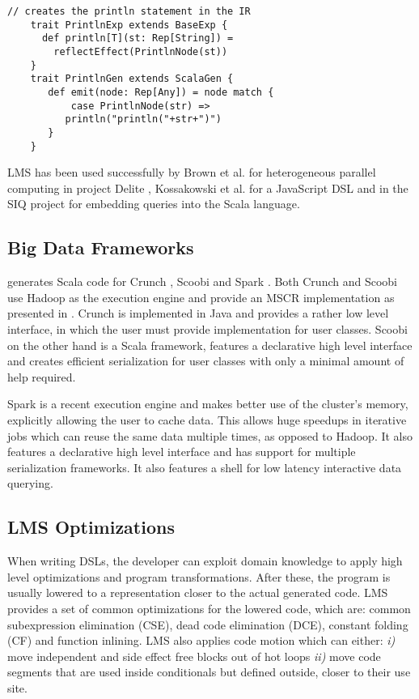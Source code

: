 \begin{lstlisting}[name=code, caption=Example of how the DSL module is specified. This module is used for measuring a performance of a block of code and can be reused in any other Scala backed DSL. ,captionpos=b, label=lst:println_dsl, float=t]
    // creates the println statement in the IR
    trait PrintlnExp extends BaseExp {
      def println[T](st: Rep[String]) =
        reflectEffect(PrintlnNode(st)) 
    }
    trait PrintlnGen extends ScalaGen {
       def emit(node: Rep[Any]) = node match {
           case PrintlnNode(str) =>
	      println("println("+str+")")
       }
    }
\end{lstlisting}

LMS has been used successfully by Brown et al. for heterogeneous parallel computing in project Delite \cite{brown_heterogeneous_2011}, Kossakowski et al. for a JavaScript DSL \cite{greg} and in the SIQ project for embedding queries into the Scala language.
\subsection{Big Data Frameworks}
\label{subsed:big-data-frameworks}
\tool generates Scala code for Crunch \cite{crunch}, Scoobi \cite{scoobi} and Spark \cite{spark-nsdi}. Both Crunch and Scoobi use Hadoop as the execution engine and provide an MSCR implementation as presented in \cite{chambers_flumejava:_2010}. Crunch is implemented in Java and provides a rather low level interface, in which the user must provide implementation for user classes. Scoobi on the other hand is a Scala framework, features a declarative high level interface and creates efficient serialization for user classes with only a minimal amount of help required. 

Spark is a recent execution engine and makes better use of the cluster's memory, explicitly allowing the user to cache data. This allows huge speedups in iterative jobs which can reuse the same data multiple times, as opposed to Hadoop. It also features a declarative high level interface and has support for multiple serialization frameworks. It also features a shell for low latency interactive data querying.

\subsection{LMS Optimizations}
\label{subsec:lms-optimizations}
When writing DSLs, the developer can exploit domain knowledge to apply high level optimizations and program transformations. After these, the program is usually lowered to a representation closer to the actual generated code. LMS provides a set of common optimizations for the lowered code, which are: common subexpression elimination (CSE), dead code elimination (DCE), constant folding (CF) and function inlining. LMS also applies code motion which can either: \emph{i)} move independent and side effect free blocks out of hot loops \emph{ii)} move code segments that are used inside conditionals but defined outside, closer to their use site.   

